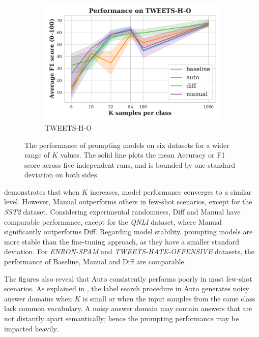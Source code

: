 \begin{figure}[!ht]
\begin{subfigure}{.33\textwidth}
  \includegraphics[width=\linewidth]{figures/evaluation_media/TWEETS-H-O_prompting_performance.pdf}
  \caption{TWEETS-H-O}
  \label{fig:tweets}
\end{subfigure}
\caption{The performance of prompting models on six datasets for a wider range of $K$ values. The solid line plots the mean Accuracy or F1 score across five independent runs, and is bounded by one standard deviation on both sides.}
\label{fig:more_k}
\end{figure}

\vspace{-0.3em}
 demonstrates that when $K$ increases, model performance converges to a similar level. However, Manual outperforms others in few-shot scenarios, except for the \textit{SST2} dataset. Considering experimental randomness, Diff and Manual have comparable performance, except for the \textit{QNLI} dataset, where Manual significantly outperforms Diff. Regarding model stability, prompting models are more stable than the fine-tuning approach, as they have a smaller standard deviation. For \textit{ENRON-SPAM} and \textit{TWEETS-HATE-OFFENSIVE} datasets, the performance of Baseline, Manual and Diff are comparable. 

The figures also reveal that Auto consistently performs poorly in most few-shot scenarios. As explained in , the label search procedure in Auto generates noisy answer domains when $K$ is small or when the input samples from the same class lack common vocabulary. A noisy answer domain may contain answers that are not distantly apart semantically; hence the prompting performance may be impacted heavily.

\vspace{-0.5em}
